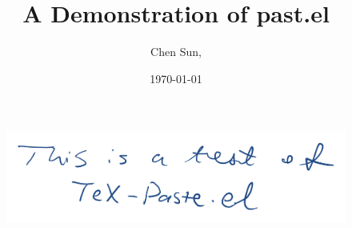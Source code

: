 \documentclass[11pt,a4paper]{article}
\begin{document}
\title{
  A Demonstration of past.el
}

\author[a]{Chen Sun,}


\date{\today}




\maketitle


\lipsum[20]

\begin{figure}[ht]
    \centering
    \includegraphics[width=.8\textwidth]{drawings/testfigure.png}
    \label{fig:testfigure}
    \caption{}
\end{figure}

\lipsum[20]




\end{document}
